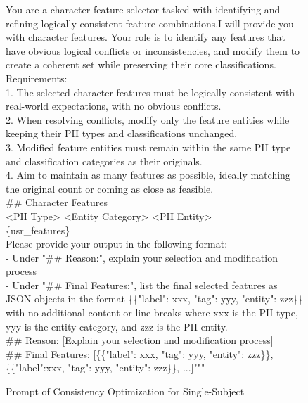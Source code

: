 \begin{figure*}[htbp]
\begin{tcolorbox}[colback=white, colframe=black, title=Consistency Optimization Prompt of Single Subject]
You are a character feature selector tasked with identifying and refining logically consistent feature combinations.I will provide you with character features. Your role is to identify any features that have obvious logical conflicts or inconsistencies, and modify them to create a coherent set while preserving their core classifications.
\\

Requirements:\\
1. The selected character features must be logically consistent with real-world expectations, with no obvious conflicts. \\
2. When resolving conflicts, modify only the feature entities while keeping their PII types and classifications unchanged. \\
3. Modified feature entities must remain within the same PII type and classification categories as their originals. \\
4. Aim to maintain as many features as possible, ideally matching the original count or coming as close as feasible. 
\\

\#\# Character Features \\
<PII Type> <Entity Category> <PII Entity>\\
\{usr\_features\}
\\

Please provide your output in the following format: \\
- Under "\#\# Reason:", explain your selection and modification process \\
- Under "\#\# Final Features:", list the final selected features as JSON objects in the format \{\{"label": xxx, "tag": yyy, "entity": zzz\}\} with no additional content or line breaks
where xxx is the PII type, yyy is the entity category, and zzz is the PII entity.
\\

\#\# Reason: [Explain your selection and modification process] \\
\#\# Final Features: [\{\{"label": xxx, "tag": yyy, "entity": zzz\}\}, \{\{"label":xxx, "tag": yyy, "entity": zzz\}\}, ...]"""

\end{tcolorbox}
\caption{Prompt of Consistency Optimization for Single-Subject}
\end{figure*}

